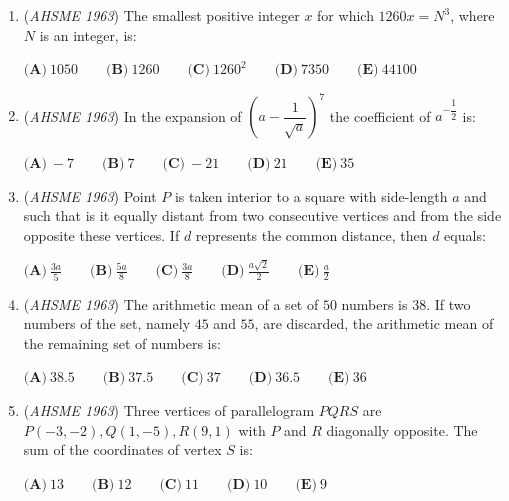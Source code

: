 \begin{enumerate}
 $\textbf{(1)}\ 3y-2x=12 \qquad\textbf{(2)}\ -2x-3y=10 \qquad\textbf{(3)}\ 3y+2x=12 \qquad\textbf{(4)}\ 2y+3x=10$


 The pair representing the perpendicular lines is:


 

$\textbf{(A)}\ \text{(1) and (4)}\qquad \textbf{(B)}\ \text{(1) and (3)}\qquad \textbf{(C)}\ \text{(1) and (2)}\qquad \textbf{(D)}\ \text{(2) and (4)}\qquad \textbf{(E)}\ \text{(2) and (3)}$


	\item (\textit{AHSME 1963}) The smallest positive integer $x$ for which $1260x=N^3$, where $N$ is an integer, is:


 

$\textbf{(A)}\ 1050 \qquad \textbf{(B)}\ 1260 \qquad \textbf{(C)}\ 1260^2 \qquad \textbf{(D)}\ 7350 \qquad \textbf{(E)}\ 44100$


	\item (\textit{AHSME 1963}) In the expansion of $\left(a-\dfrac{1}{\sqrt{a}}\right)^7$ the coefficient of $a^{-\dfrac{1}{2}}$ is:


 $\textbf{(A)}\ -7 \qquad \textbf{(B)}\ 7 \qquad \textbf{(C)}\ -21 \qquad \textbf{(D)}\ 21 \qquad \textbf{(E)}\ 35$


	\item (\textit{AHSME 1963}) Point $P$ is taken interior to a square with side-length $a$ and such that is it equally distant from two 
consecutive vertices and from the side opposite these vertices. If $d$ represents the common distance, then $d$ equals:


 $\textbf{(A)}\ \frac{3a}{5}\qquad \textbf{(B)}\ \frac{5a}{8}\qquad \textbf{(C)}\ \frac{3a}{8}\qquad \textbf{(D)}\ \frac{a\sqrt{2}}{2}\qquad \textbf{(E)}\ \frac{a}{2}$


	\item (\textit{AHSME 1963}) The arithmetic mean of a set of $50$ numbers is $38$. If two numbers of the set, namely $45$ and $55$, are discarded, 
the arithmetic mean of the remaining set of numbers is:


 $\textbf{(A)}\ 38.5 \qquad \textbf{(B)}\ 37.5 \qquad \textbf{(C)}\ 37 \qquad \textbf{(D)}\ 36.5 \qquad \textbf{(E)}\ 36$


	\item (\textit{AHSME 1963}) Three vertices of parallelogram $PQRS$ are $P(-3,-2), Q(1,-5), R(9,1)$ with $P$ and $R$ diagonally opposite. 
The sum of the coordinates of vertex $S$ is:


 $\textbf{(A)}\ 13 \qquad \textbf{(B)}\ 12 \qquad \textbf{(C)}\ 11 \qquad \textbf{(D)}\ 10 \qquad \textbf{(E)}\ 9$



\end{enumerate}
